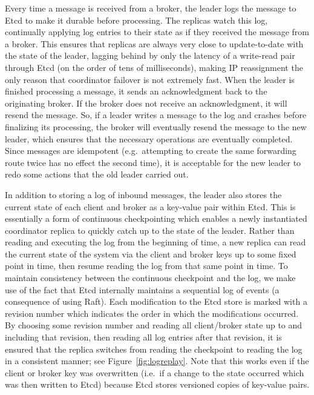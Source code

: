 Every time a message is received from a broker, the leader logs the message to Etcd to make it durable before processing.
The replicas watch this log, continually applying log entries to their state as if they received the message from a broker.
This ensures that replicas are always very close to update-to-date with the state of the leader, lagging behind by only the latency of a write-read pair through Etcd (on the order of tens of milliseconds), making IP reassignment the only reason that coordinator failover is not extremely fast.
When the leader is finished processing a message, it sends an acknowledgment back to the originating broker.
If the broker does not receive an acknowledgment, it will resend the message.
So, if a leader writes a message to the log and crashes before finalizing its processing, the broker will eventually resend the message to the new leader, which ensures that the necessary operations are eventually completed.
Since messages are idempotent (e.g.\ attempting to create the same forwarding route twice has no effect the second time), it is acceptable for the new leader to redo some actions that the old leader carried out.

In addition to storing a log of inbound messages, the leader also stores the current state of each client and broker as a key-value pair within Etcd.
This is essentially a form of continuous checkpointing which enables a newly instantiated coordinator replica to quickly catch up to the state of the leader.
Rather than reading and executing the log from the beginning of time, a new replica can read the current state of the system via the client and broker keys up to some fixed point in time, then resume reading the log from that same point in time.
To maintain consistency between the continuous checkpoint and the log, we make use of the fact that Etcd internally maintains a sequential log of events (a consequence of using Raft).
Each modification to the Etcd store is marked with a revision number which indicates the order in which the modifications occurred.
By choosing some revision number and reading all client/broker state up to and including that revision, then reading all log entries after that revision, it is ensured that the replica switches from reading the checkpoint to reading the log in a consistent manner; see Figure~\ref{fig:logreplay}.
Note that this works even if the client or broker key was overwritten (i.e.\ if a change to the state occurred which was then written to Etcd) because Etcd stores versioned copies of key-value pairs.

